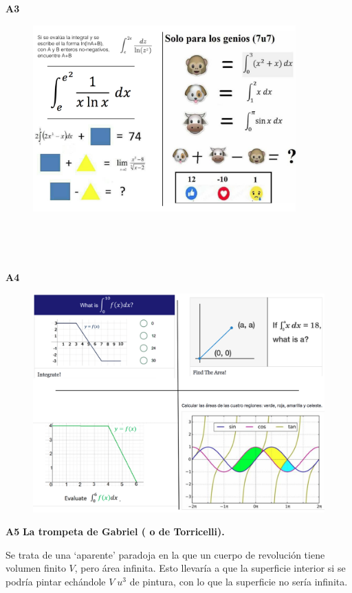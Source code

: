  \textbf{A3}  \begin{figure}[H]
		\centering
		\includegraphics[width=0.9\textwidth]{imagenes/imagenes08/T08IM33.png}
	\end{figure}

$\quad$

$\quad$

	
\textbf{A4} \begin{figure}[H]
		\centering
		\includegraphics[width=.9\textwidth]{imagenes/imagenes08/T08IM34.png}
	\end{figure}
	

\textbf{A5} \textbf{La trompeta de Gabriel ( o de Torricelli).}

Se trata de una `aparente' paradoja en la que un cuerpo de revolución tiene volumen finito $V$, pero área infinita. Esto llevaría a que la superficie interior si se podría pintar echándole $V\; u^3$ de pintura, con lo que la superficie no sería infinita.

